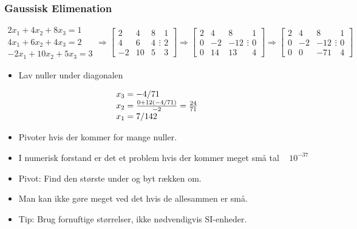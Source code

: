 \documentclass[a4wide,10pt]{article}
\begin{document}
\subsubsection{Gaussisk Elimenation} %
\label{ssub:gaussisk_elimenation}
\[\begin{array}{*{20}{c}}
{2{x_1} + 4{x_2} + 8{x_3} = 1}\\
{4{x_1} + 6{x_2} + 4{x_3} = 2}\\
{ - 2{x_1} + 10{x_2} + 5{x_3} = 3}
\end{array} \Rightarrow \left[ {\begin{array}{*{20}{c}}
2&4&8\\
4&6&4\\
{ - 2}&{10}&5
\end{array} \vdots \begin{array}{*{20}{c}}
1\\
2\\
3
\end{array}} \right] \Rightarrow \left[ {\begin{array}{*{20}{c}}
2&4&8\\
0&{ - 2}&{ - 12}\\
0&{14}&{13}
\end{array} \vdots \begin{array}{*{20}{c}}
1\\
0\\
4
\end{array}} \right] \Rightarrow \left[ {\begin{array}{*{20}{c}}
2&4&8\\
0&{ - 2}&{ - 12}\\
0&0&{ - 71}
\end{array} \vdots \begin{array}{*{20}{c}}
1\\
0\\
4
\end{array}} \right]\]
\begin{itemize}
	\item Lav nuller under diagonalen
\end{itemize}
\[\begin{array}{l}
{x_3} =  - {4 \mathord{\left/
 {\vphantom {4 {71}}} \right.
 \kern-\nulldelimiterspace} {71}}\\
{x_2} = \frac{{0 + 12( - {4 \mathord{\left/
 {\vphantom {4 {71}}} \right.
 \kern-\nulldelimiterspace} {71}})}}{{ - 2}} = \frac{{24}}{{71}}\\
{x_1} = {7 \mathord{\left/
 {\vphantom {7 {142}}} \right.
 \kern-\nulldelimiterspace} {142}}
\end{array}\]
\begin{itemize}
	\item Pivoter hvis der kommer for mange nuller.
	\item I numerisk forstand er det et problem hvis der kommer meget små tal ~ $10^{-37}$
	\item Pivot: Find den største under og byt rækken om.
	\item Man kan ikke gøre meget ved det hvis de allesammen er små.
	\item Tip: Brug fornuftige størrelser, ikke nødvendigvis SI-enheder.
\end{itemize}
\end{document}
